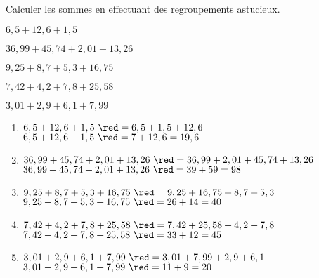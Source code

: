 \begin{exercice*}
    Calculer les sommes en effectuant des regroupements astucieux.    
    \begin{enumerate}
        \begin{spacing}{1.5}
            \item $6,5+12,6+1,5$
            \item $36,99+45,74+2,01+13,26$
            \item $9,25+8,7+5,3+16,75$
            \item $7,42+4,2+7,8+25,58$
            \item $3,01+2,9+6,1+7,99$
        \end{spacing}
    \end{enumerate}      
 \end{exercice*}
 \begin{corrige}
    \begin{enumerate}
        \item $6,5+12,6+1,5             ~{\red = 6,5 + 1,5 + 12,6}$
        $6,5+12,6+1,5             ~{\red = 7 + 12,6 = 19,6}$
        \item $36,99+45,74+2,01+13,26   ~{\red = 36,99 + 2,01 + 45,74 + 13,26}$
        $36,99+45,74+2,01+13,26   ~{\red = 39 + 59 = 98}$
        \item $9,25+8,7+5,3+16,75       ~{\red = 9,25 + 16,75 + 8,7 + 5,3}$
        $9,25+8,7+5,3+16,75       ~{\red = 26 + 14 = 40}$
        \item $7,42+4,2+7,8+25,58       ~{\red = 7,42 + 25,58 + 4,2 + 7,8}$
        $7,42+4,2+7,8+25,58       ~{\red = 33 + 12 = 45}$
        \item $3,01+2,9+6,1+7,99        ~{\red = 3,01+7,99+2,9+6,1}$
        $3,01+2,9+6,1+7,99        ~{\red = 11+9=20}$
    \end{enumerate}
 \end{corrige}